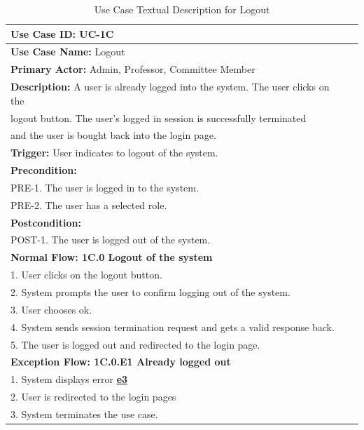 \documentclass[fontsize=12pt,paper=letter,twoside]{scrartcl}
\begin{document}
\begin{table}[!htb]
\begin{center}
\begin{tabular}{|l|l|}
\hline
\textbf{Use Case ID:} UC-1C \\ \hline
\textbf{Use Case Name:} Logout \\ \hline
\textbf {Primary Actor:} Admin, Professor, Committee Member\\ \hline
\textbf{Description:} A user is already logged into the system. The user clicks on the \\logout button. The user's logged in session is successfully terminated \\and the user is bought back into the login page. \\ \hline
\textbf{Trigger:} User indicates to logout of the system.\\ \hline
\textbf{Precondition:}
\\ PRE-1. The user is logged in to the system.
\\ PRE-2. The user has a selected role. \\ \hline
\textbf{Postcondition:}
\\ POST-1. The user is logged out of the system. \\ \hline
\textbf{Normal Flow: 1C.0 Logout of the system}
\\ 1. User clicks on the logout button.
\\ 2. System prompts the user to confirm logging out of the system.
\\ 3. User chooses ok.
\\ 4. System sends session termination request and gets a valid response back.
\\ 5. The user is logged out and redirected to the login page.\\ \hline
\textbf{Exception Flow: 1C.0.E1 Already logged out}
\\ 1. System displays error \hyperref[app:error]{\textbf{e3}}
\\ 2. User is redirected to the login pages
\\ 3. System terminates the use case.\\ \hline
\end{tabular}
\end{center}
\caption {Use Case Textual Description for Logout}
\label{tbl:uc1Ctd}
\end{table}
\end{document}
